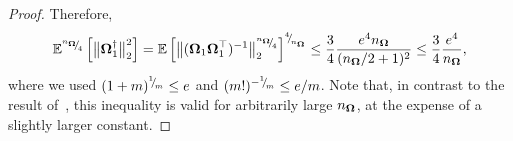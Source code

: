 \begin{proof}
    Therefore,
    \begin{equation}
      \mathbb{E}^{{}^{n_{\boldsymbol{\Omega}}}{\mskip -5mu/\mskip -3mu}_{4}}\left[ \big\| \boldsymbol{\Omega}_1^{\dagger} \big\|_2^2 \right]
        = \mathbb{E}\left[ \big\| ( \boldsymbol{\Omega}_1 \boldsymbol{\Omega}_1^{\top} )^{-1} \big\|_2^{{}^{n_{\boldsymbol{\Omega}}}{\mskip -5mu/\mskip -3mu}_{4}} \right]^{{}^{4}{\mskip -5mu/\mskip -3mu}_{n_{\boldsymbol{\Omega}}}}
        \le \frac{3}{4}  
        \frac{e^4 n_{\boldsymbol{\Omega}}}{(n_{\boldsymbol{\Omega}} / 2+ 1)^2} \le 
        \frac{3}{4}  \frac{e^4}{n_{\boldsymbol{\Omega}}},
        \label{equ:pinv-spectral-norm-bound}
    \end{equation}
    where we used $(1 + m)^{{}^{1}{\mskip -5mu/\mskip -3mu}_{m}} \leq e$ and $(m!)^{-{}^{1}{\mskip -5mu/\mskip -3mu}_{m}} \leq e/m$. Note that, in contrast 
    to the result of~\cite[Lemma B.3]{tropp-2023-randomized-algorithms}, this inequality is valid for arbitrarily large $n_{\boldsymbol{\Omega}}$, at the expense of a slightly larger constant.
%

\end{proof}
